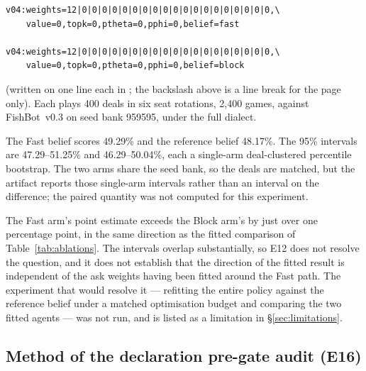 \documentclass[11pt]{article}
\theoremstyle{definition}
\DeclareRobustCommand{\vthree}{\texorpdfstring{\mbox{FishBot v0.3}}{FishBot v0.3}}
\newcommand{\numETwelveFast}{49.29}
\newcommand{\numETwelveFastCI}{47.29--51.25}
\newcommand{\numETwelveBlock}{48.17}
\newcommand{\numETwelveBlockCI}{46.29--50.04}
\newcommand{\numETwelveDeals}{400}
\newcommand{\numETwelveGames}{2{,}400}
\begin{document}
\begin{verbatim}
v04:weights=12|0|0|0|0|0|0|0|0|0|0|0|0|0|0|0|0|0|0|0,\
    value=0,topk=0,ptheta=0,pphi=0,belief=fast

v04:weights=12|0|0|0|0|0|0|0|0|0|0|0|0|0|0|0|0|0|0|0,\
    value=0,topk=0,ptheta=0,pphi=0,belief=block
\end{verbatim}

(written on one line each in ; the backslash above
is a line break for the page only). Each plays \numETwelveDeals{} deals in six
seat rotations, \numETwelveGames{} games, against \vthree{} on seed bank 959595,
under the full dialect.

The Fast belief scores \numETwelveFast\% and the reference belief
\numETwelveBlock\%. The 95\% intervals are \numETwelveFastCI\% and
\numETwelveBlockCI\%, each a single-arm deal-clustered percentile bootstrap. The
two arms share the seed bank, so the deals are matched, but the artifact reports
those single-arm intervals rather than an interval on the difference; the paired
quantity was not computed for this experiment.

The Fast arm's point estimate exceeds the Block arm's by just over one
percentage point, in the same direction as
the fitted comparison of Table~\ref{tab:ablations}. The intervals overlap
substantially, so E12 does not resolve the question, and it does not establish
that the direction of the fitted result is independent of the ask weights having
been fitted around the Fast path. The experiment that would resolve it ---
refitting the entire policy against the reference belief under a matched
optimisation budget and comparing the two fitted agents --- was not run, and is
listed as a limitation in \S\ref{sec:limitations}.

\subsection{Method of the declaration pre-gate audit (E16)}
\label{app:abl-gateaudit}
\end{document}
